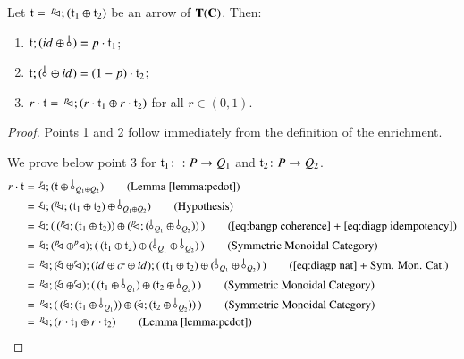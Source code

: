 \begin{lemma}\label{lemma:basicTC}
Let $\mathfrak{t}=\,^p\!\! \lhd_{} ; (\mathfrak{t}_1 \oplus \mathfrak{t}_2)$ be an arrow of $\mathbf{T}(\mathbf{C})$. Then:
\begin{enumerate}
\item $\t; (\id{} \oplus \bang{}) = p\cdot \t_1$;
\item $\t ; (\bang{} \oplus \id{}) = (1-p) \cdot \t_2$;
\item $r \cdot \mathfrak{t} =\, ^p\!\! \lhd_{} ; (r\cdot \mathfrak{t}_1 \oplus r\cdot \mathfrak{t}_2)$ for all $r\in (0,1)$.
\end{enumerate}
\end{lemma}
\begin{proof}
Points 1 and 2 follow immediately from the definition of the enrichment.

We prove below point 3 for $\mathfrak{t}_1\colon:P\to Q_1$ and $\mathfrak{t}_2\colon P\to Q_2$.
\begin{align*}
r \cdot \t &=\, \diagpX{r}{} ; (\t \oplus \bang{Q_1\piu Q_2}) \tag{Lemma \ref{lemma:pcdot}}\\
&=\, \diagpX{r}{} ; (\diagp{} ; (\t_1 \oplus \t_2) \oplus \bang{{Q_1\piu Q_2}}) \tag{Hypothesis}\\
&=\, \diagpX{r}{} ; ( \, (\diagp{} ; (\t_1 \oplus \t_2)) \oplus (\diagp{}; (\bang{Q_1} \oplus \bang{Q_2}))\, ) \tag{\ref{eq:bangp coherence} + \ref{eq:diagp idempotency}}\\
&=\, \diagpX{r}{} ; (\diagp{} \oplus \diagp{}) ; (\,  (\t_1 \oplus \t_2) \oplus (\bang{Q_1} \oplus \bang{Q_2}) \, ) \tag{Symmetric Monoidal Category}\\
&=\, \diagp{} ; (\diagpX{r}{} \oplus \diagpX{r}{}) ; (\id{} \oplus \symm \oplus \id{}) ; (\,  (\t_1 \oplus \t_2) \oplus (\bang{Q_1} \oplus \bang{Q_2}) \, ) \tag{\ref{eq:diagp nat} + Sym. Mon. Cat.}\\
&=\, \diagp{} ; (\diagpX{r}{} \oplus \diagpX{r}{}) ;  (\,  (\t_1 \oplus \bang{Q_1}) \oplus (\t_2 \oplus \bang{Q_2}) \, ) \tag{Symmetric Monoidal Category}\\
&=\, \diagp{} ; ( \,(\diagpX{r}{} ; (\t_1 \oplus \bang{Q_1})) \oplus (\diagpX{r}{} ;(\t_2 \oplus \bang{Q_2})) \, ) \tag{Symmetric Monoidal Category}\\
&=\, \diagp{} ; (r\cdot \t_1 \oplus r\cdot \t_2)  \tag{Lemma \ref{lemma:pcdot}}
\end{align*}
 
\end{proof}

